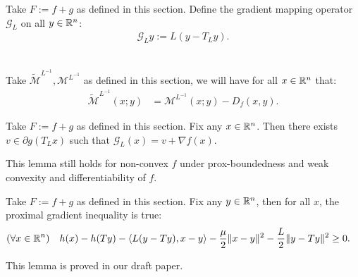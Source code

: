 \documentclass[12pt]{article}
\begin{document}
            \begin{definition}\label{def:gradient-mapping-operator}
                Take $F := f + g$ as defined in this section. 
                Define the gradient mapping operator $\mathcal G_L$ on all $y \in \mathbb R^n$: 
                \begin{align*}
                    \mathcal G_L y:= L(y - T_L y). 
                \end{align*}
            \end{definition}

            \begin{lemma}\;\\
                Take $\widetilde{\mathcal M}^{L^{-1}}, \mathcal M^{L^{-1}}$ as defined in this section, we will have for all $x \in \mathbb R^n$ that: 
                \begin{align*}
                    \widetilde{\mathcal M}^{L^{-1}}(x; y)
                    &= 
                    \mathcal M^{L^{-1}}(x; y)- D_f(x, y).
                \end{align*}
            \end{lemma}
            \begin{lemma}
                Take $F:= f + g$ as defined in this section. 
                Fix any $x \in \mathbb R^n$. 
                Then there exists $v \in \partial g(T_L x)$ such that $\mathcal G_L (x) = v + \nabla f(x)$. 
            \end{lemma}
            \begin{remark}
                This lemma still holds for non-convex $f$ under prox-boundedness and weak convexity and differentiability of $f$. 
            \end{remark}
            \begin{lemma}\label{thm:prox-grad-ineq}
                Take $F:= f + g$ as defined in this section. 
                Fix any $y \in \mathbb R^n$, then for all $x$, the proximal gradient inequality is true: 
                \begin{align*}
                    (\forall x \in \mathbb R^n)\quad 
                    h(x)  - h(Ty) - \langle L(y - Ty), x - y\rangle
                    - \frac{\mu}{2}\Vert x - y\Vert^2 - \frac{L}{2}\Vert y - Ty\Vert^2 
                    &\ge 0. 
                \end{align*}
            \end{lemma}
            \begin{remark}
                This lemma is proved in our draft paper. 
            \end{remark}
\end{document}
